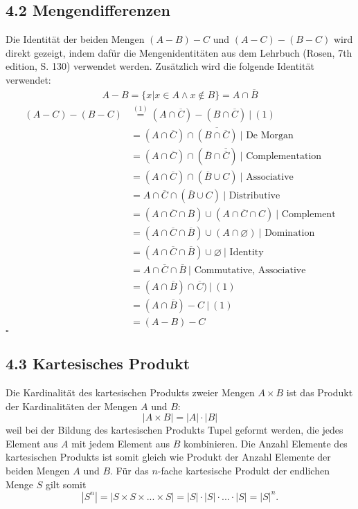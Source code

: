 \documentclass[12pt,a4paper]{article}
\begin{document}
\subsection*{4.2 Mengendifferenzen}
Die Identität der beiden Mengen $(A-B)-C$ und $(A-C)-(B-C)$ wird direkt gezeigt, indem dafür die Mengenidentitäten aus dem Lehrbuch (Rosen, 7th edition, S. 130) verwendet werden. Zusätzlich wird die folgende Identität verwendet:
\begin{align}
A-B = \{x | x \in A \land x \not\in B\} = A\cap \overline{B} 
\end{align}
\begin{align*}
(A-C)-(B-C) & \stackrel{(1)}{=} (A\cap \overline{C}) - (B \cap \overline{C})~|~(1)\\
&= (A\cap \overline{C}) \cap\overline{(B\cap \overline{C})}~|\text{ De Morgan}\\
&= (A\cap \overline{C}) \cap (\overline{B} \cap \overline{\overline{C}})~| \text{ Complementation}\\
&= (A\cap \overline{C}) \cap (\overline{B} \cup C)~| \text{ Associative}\\
&= A\cap \overline{C} \cap (\overline{B} \cup C)~| \text{ Distributive}\\
&= (A\cap \overline{C} \cap \overline{B}) \cup  (A\cap \overline{C} \cap C)~| \text{ Complement}\\
&= (A\cap \overline{C} \cap \overline{B}) \cup  (A\cap \varnothing)~| \text{ Domination}\\
&= (A\cap \overline{C} \cap \overline{B}) \cup  \varnothing~| \text{ Identity}\\
&= A\cap \overline{C} \cap \overline{B}~| \text{ Commutative, Associative}\\
&= (A\cap  \overline{B})\cap\overline{C} )~|~(1)\\
&= (A \cap \overline{B}) - C~|~(1)\\
&= (A-B)-C
\end{align*}
\hfill$\square$
\subsection*{4.3 Kartesisches Produkt}
Die Kardinalität des kartesischen Produkts zweier Mengen $A \times B$ ist das Produkt der Kardinalitäten der Mengen $A$ und $B$:
$$|A \times B | = |A|\cdot |B|$$
weil bei der Bildung des kartesischen Produkts Tupel geformt werden, die jedes Element aus $A$ mit jedem Element aus $B$ kombinieren. Die Anzahl Elemente des kartesischen Produkts ist somit gleich wie Produkt der Anzahl Elemente der beiden Mengen $A$ und $B$. Für das $n$-fache kartesische Produkt der endlichen Menge $S$ gilt somit
$$|S^n| = |S \times S \times ... \times S| = |S|\cdot|S|\cdot ... \cdot |S| = |S|^n.$$
\end{document}
